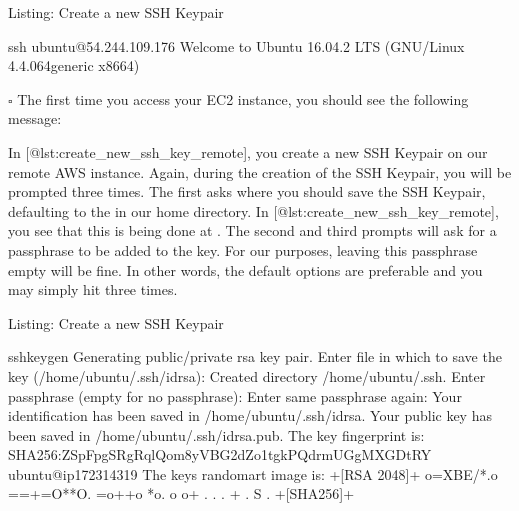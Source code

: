 \documentclass[letterpaper,10pt,english]{sphinxmanual}
\begin{document}
Listing: Create a new SSH Keypair

%
\begin{sphinxVerbatim}[commandchars=\\\{\}]
\PYGZdl{} ssh ubuntu@54.244.109.176
Welcome to Ubuntu 16.04.2 LTS (GNU/Linux 4.4.0\PYGZhy{}64\PYGZhy{}generic x86\PYGZus{}64)
\end{sphinxVerbatim}

\(\square\)  The first time you access your EC2 instance,
you should see the following message:

In {[}@lst:create\_new\_ssh\_key\_remote{]}, you create a new SSH Keypair on
our remote AWS instance. Again, during the creation of the SSH Keypair,
you will be prompted three times. The first asks where you should save
the SSH Keypair, defaulting to the  in our home
directory. In {[}@lst:create\_new\_ssh\_key\_remote{]}, you see that this is
being done at
.
The second and third prompts will ask for a passphrase to be added to
the key. For our purposes, leaving this passphrase empty will be fine.
In other words, the default options are preferable and you may simply
hit  three times.

Listing: Create a new SSH Keypair

%
\begin{sphinxVerbatim}[commandchars=\\\{\}]
\PYGZdl{} ssh\PYGZhy{}keygen
Generating public/private rsa key pair.
Enter file in which to save the key (/home/ubuntu/.ssh/id\PYGZus{}rsa):
Created directory \PYGZsq{}/home/ubuntu/.ssh\PYGZsq{}.
Enter passphrase (empty for no passphrase):
Enter same passphrase again:
Your identification has been saved in /home/ubuntu/.ssh/id\PYGZus{}rsa.
Your public key has been saved in /home/ubuntu/.ssh/id\PYGZus{}rsa.pub.
The key fingerprint is:
SHA256:ZSpFpgSRgRqlQom8yVBG2dZo1tgkPQdrmUGgMXGDtRY
ubuntu@ip\PYGZhy{}172\PYGZhy{}31\PYGZhy{}43\PYGZhy{}19
The key\PYGZsq{}s randomart image is:
+\PYGZhy{}\PYGZhy{}\PYGZhy{}[RSA 2048]\PYGZhy{}\PYGZhy{}\PYGZhy{}\PYGZhy{}+
\textbar{}o=XBE/*.o        \textbar{}
\textbar{}==+=O**O.        \textbar{}
\textbar{}=o++o *o. o      \textbar{}
\textbar{}o+ . . . +       \textbar{}
\textbar{}      . S        \textbar{}
\textbar{}       .         \textbar{}
\textbar{}                 \textbar{}
\textbar{}                 \textbar{}
\textbar{}                 \textbar{}
+\PYGZhy{}\PYGZhy{}\PYGZhy{}\PYGZhy{}[SHA256]\PYGZhy{}\PYGZhy{}\PYGZhy{}\PYGZhy{}\PYGZhy{}+
\end{sphinxVerbatim}
\end{document}
